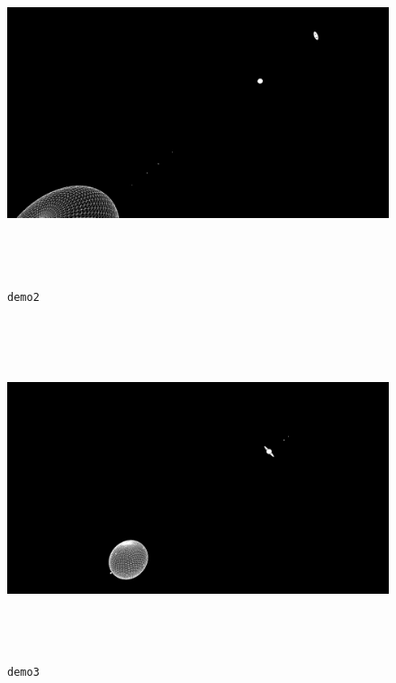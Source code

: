 \documentclass[11pt,a4paper]{report}
\begin{document}
\begin{figure}[H]
\centering
\includegraphics[width = 15cm,height = 10cm]{2.png}
\caption{\texttt{demo2}}
\label{fig:demo2}
\end{figure}

\begin{figure}[H]
\centering
\includegraphics[width = 15cm,height = 10cm]{3.png}
\caption{\texttt{demo3}}
\label{fig:demo3}
\end{figure}
\end{document}
